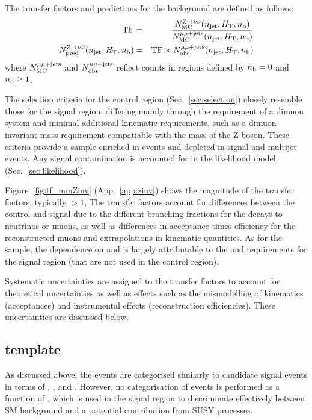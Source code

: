 The transfer factors and predictions for the \znunuj background are
defined as follows:
\begin{eqnarray}
  \label{equ:tf-ratio-zinv}
  {\rm TF} & = &   
  \frac{N_{\rm MC}^{{\text Z} \rightarrow \nu\bar{\nu}}(n_{\text{jet}}, \mbox{$H_\text{T}$}, n_{\text{b}})}
  {N_{\rm MC}^{\mu\mu + \textrm{jets}}(n_{\text{jet}}, \mbox{$H_\text{T}$}, n_{\text{b}})} \\
  N_{\textrm{pred}}^{{\text Z} \rightarrow \nu\bar{\nu}}(n_{\text{jet}}, \mbox{$H_\text{T}$}, n_{\text{b}}) & = &
  {\rm TF}
  \times 
  N_{\textrm{obs}}^{\mu\mu + \textrm{jets}}(n_{\text{jet}}, \mbox{$H_\text{T}$}, n_{\text{b}})   
\end{eqnarray}
where $N_{\rm MC}^{\mu\mu + \textrm{jets}}$ and $N_{\textrm{obs}}^{\mu\mu + \textrm{jets}}$ reflect counts in regions
defined by $n_{\text{b}} = 0$ and $n_{\text{b}} \geq 1$.

The selection criteria for the \mmj control region
(Sec.~\ref{sec:selection}) closely resemble those for the signal
region, differing mainly through the requirement of a dimuon system
and minimal additional kinematic requirements, such as a dimuon
invariant mass requirement compatiable with the mass of the Z
boson. These criteria provide a sample enriched in \zmmj events and
depleted in signal and multijet events. Any signal contamination is
accounted for in the likelihood model (Sec.~\ref{sec:likelihood}).

Figure~\ref{fig:tf_mmZinv} (App.~\ref{app:zinv}) shows the magnitude
of the transfer factors, typically $>1$, The transfer factors account
for differences between the \mmj control and signal due to the
different branching fractions for the decays to neutrinos or muons, as
well as differences in acceptance times efficiency for the
reconstructed muons and extrapolations in kinematic quantities. As for
the \mj sample, the dependence on \njet and \scalht is largely
attributable to the \alphat and \bdphi requirements for the signal
region (that are not used in the \mmj control region).

Systematic uncertainties are assigned to the transfer factors to
account for theoretical uncertainties as well as effects such as the
mismodelling of kinematics (\eg acceptances) and instrumental effects
(\eg reconstruction efficiencies). These uncertainties are discussed
below.

\subsection{\texorpdfstring{\mht}{MHT} template}

As discussed above, the \mmj events are categorised similarly to
candidate signal events in terms of \njet, \scalht, and \nb. However,
no categorisation of \mmj events is performed as a function of \mht,
which is used in the signal region to discriminate effectively between
SM background and \eg a potential contribution from SUSY processes.


